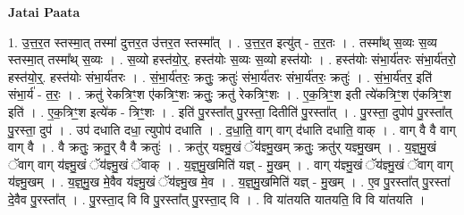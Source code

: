 \documentclass[17pt]{extarticle}
\begin{document}
\textbf{Jatai Paata} \newline

1. उ॒त्त॒र॒त स्तस्मा॒त् तस्मा॑ दुत्तर॒त उ॑त्तर॒त स्तस्मा᳚त् । . उ॒त्त॒र॒त इत्यु॑त् - त॒र॒तः । . तस्मा᳚थ् स॒व्यः स॒व्य स्तस्मा॒त् तस्मा᳚थ् स॒व्यः । . स॒व्यो हस्त॑यो॒र्॒. हस्त॑योः स॒व्यः स॒व्यो हस्त॑योः । . हस्त॑योः संभा॒र्य॑तरः संभा॒र्य॑तरो॒ हस्त॑यो॒र्॒. हस्त॑योः संभा॒र्य॑तरः । . सं॒भा॒र्य॑तरः॒ क्रतुः॒ क्रतुः॑ संभा॒र्य॑तरः संभा॒र्य॑तरः॒ क्रतुः॑ । . सं॒भा॒र्य॑तर॒ इति॑ संभा॒र्य॑ - त॒रः॒ । . क्रतु॑ रेकत्रिꣳ॒॒श ए॑कत्रिꣳ॒॒शः क्रतुः॒ क्रतु॑ रेकत्रिꣳ॒॒शः । . ए॒क॒त्रिꣳ॒॒श इती त्ये॑कत्रिꣳ॒॒श ए॑कत्रिꣳ॒॒श इति॑ । . ए॒क॒त्रिꣳ॒॒श इत्ये॑क - त्रिꣳ॒॒शः । . इति॑ पु॒रस्ता᳚त् पु॒रस्ता॒ दितीति॑ पु॒रस्ता᳚त् । . पु॒रस्ता॒ दुपोप॑ पु॒रस्ता᳚त् पु॒रस्ता॒ दुप॑ । . उप॑ दधाति दधा॒ त्युपोप॑ दधाति । . द॒धा॒ति॒ वाग् वाग् द॑धाति दधाति॒ वाक् । . वाग् वै वै वाग् वाग् वै । . वै क्रतुः॒ क्रतु॒र् वै वै क्रतुः॑ । . क्रतु॑र् यज्ञ्मु॒खं ॅय॑ज्ञ्मु॒खम् क्रतुः॒ क्रतु॑र् यज्ञ्मु॒खम् । . य॒ज्ञ्॒मु॒खं ॅवाग् वाग् य॑ज्ञ्मु॒खं ॅय॑ज्ञ्मु॒खं ॅवाक् । . य॒ज्ञ्॒मु॒खमिति॑ यज्ञ् - मु॒खम् । . वाग् य॑ज्ञ्मु॒खं ॅय॑ज्ञ्मु॒खं ॅवाग् वाग् य॑ज्ञ्मु॒खम् । . य॒ज्ञ्॒मु॒ख मे॒वैव य॑ज्ञ्मु॒खं ॅय॑ज्ञ्मु॒ख मे॒व । . य॒ज्ञ्॒मु॒खमिति॑ यज्ञ् - मु॒खम् । . ए॒व पु॒रस्ता᳚त् पु॒रस्ता॑ दे॒वैव पु॒रस्ता᳚त् । . पु॒रस्ता॒द् वि वि पु॒रस्ता᳚त् पु॒रस्ता॒द् वि । . वि या॑तयति यातयति॒ वि वि या॑तयति । \newline
\end{document}
